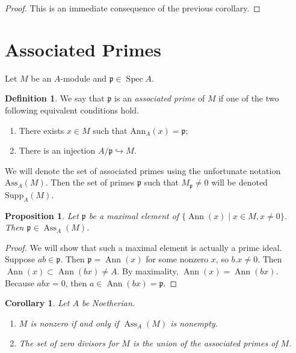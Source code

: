 \documentclass[leqno, openany]{memoir}
\newtheorem{cor}[thm]{Corollary}
\newtheorem{prop}[thm]{Proposition}
\theoremstyle{definition}
\newtheorem{defn}[thm]{Definition}
\theoremstyle{remark}
\theoremstyle{plain}
\theoremstyle{definition}
\theoremstyle{remark}
\newcommand{\mf}[1]{\mathfrak{#1}}
\newcommand{\mr}[1]{\mathrm{#1}}
\DeclareMathOperator{\Spec}{Spec}
\DeclareMathOperator{\Ann}{Ann}
\DeclareMathOperator{\Ass}{Ass}
\begin{document}
\begin{proof}
    This is an immediate consequence of the previous corollary.
\end{proof}

\section{Associated Primes}%
\label{sec:associated_primes}

Let $M$ be an $A$-module and $\mf{p} \in \Spec A$.

\begin{defn}
    We say that $\mf{p}$ is an \textit{associated prime} of $M$ if one of the two following equivalent conditions hold.
    \begin{enumerate}
        \item There exists $x \in M$ such that $\mr{Ann}_A(x) = \mf{p}$;
        \item There is an injection $A / \mf{p} \hookrightarrow M$.
    \end{enumerate}
\end{defn}

We will denote the set of associated primes using the unfortunate notation $\mr{Ass}_A(M)$. Then the set of primes $\mf{p}$ such that $M_{\mf{p}} \neq 0$ will be denoted $\mr{Supp}_A(M)$.

\begin{prop}
    Let $\mf{p}$ be a maximal element of $\{ \Ann(x) \mid x \in M, x \neq 0 \}$. Then $\mf{p} \in \Ass_A(M)$.
\end{prop}

\begin{proof}
    We will show that such a maximal element is actually a prime ideal. Suppose $ab \in \mf{p}$. Then $\mf{p} = \Ann(x)$ for some nonzero $x$, so $b.x \neq 0$. Then $\Ann(x) \subset \Ann(bx) \neq A$. By maximality, $\Ann(x) = \Ann(bx)$. Because $abx = 0$, then $a \in \Ann(bx) = \mf{p}$.
\end{proof}

\begin{cor}
    Let $A$ be Noetherian.
    \begin{enumerate}
        \item $M$ is nonzero if and only if $\Ass_A(M)$ is nonempty.
        \item The set of zero divisors for $M$ is the union of the associated primes of $M$.
    \end{enumerate}
\end{cor}
\end{document}
